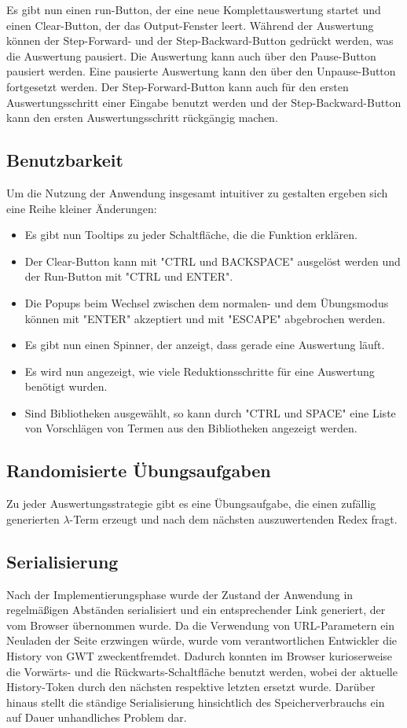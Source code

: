 \documentclass[parskip=full,11pt,openany]{scrreprt}
\begin{document}
Es gibt nun einen run-Button, der eine neue Komplettauswertung startet und einen Clear-Button, der das Output-Fenster leert.
Während der Auswertung können der Step-Forward- und der Step-Backward-Button gedrückt werden, was die Auswertung pausiert. 
Die Auswertung kann auch über den Pause-Button pausiert werden.
Eine pausierte Auswertung kann den über den Unpause-Button fortgesetzt werden.
Der Step-Forward-Button kann auch für den ersten Auswertungsschritt einer Eingabe benutzt werden und der Step-Back\-ward-Button
kann den ersten Auswertungsschritt rückgängig machen.

\subsection{Benutzbarkeit}
Um die Nutzung der Anwendung insgesamt intuitiver zu gestalten ergeben sich eine Reihe kleiner Änderungen:

\begin{itemize}
\item Es gibt nun Tooltips zu jeder Schaltfläche, die die Funktion erklären.
\item Der Clear-Button kann mit "CTRL und BACKSPACE" ausgelöst werden und der Run-Button mit "CTRL und ENTER".
\item Die Popups beim Wechsel zwischen dem normalen- und dem Übungsmodus können mit "ENTER" akzeptiert und mit
"ESCAPE" abgebrochen werden.
\item Es gibt nun einen Spinner, der anzeigt, dass gerade eine Auswertung läuft.
\item Es wird nun angezeigt, wie viele Reduktionsschritte für eine Auswertung benötigt wurden.
\item Sind Bibliotheken ausgewählt, so kann durch "CTRL und SPACE" eine Liste von Vorschlägen von Termen aus den 
Bibliotheken angezeigt werden.
\end{itemize}

\subsection{Randomisierte Übungsaufgaben}
Zu jeder Auswertungsstrategie gibt es eine Übungsaufgabe, die einen zufällig generierten $\lambda$-Term erzeugt
und nach dem nächsten auszuwertenden Redex fragt.

\subsection{Serialisierung}
Nach der Implementierungsphase wurde der Zustand der Anwendung in regelmäßigen Abständen serialisiert und 
ein entsprechender Link generiert, der vom Browser übernommen wurde.
Da die Verwendung von URL-Parametern ein Neuladen der Seite erzwingen würde, wurde vom verantwortlichen 
Entwickler die History von GWT zweckentfremdet.
Dadurch konnten im Browser kurioserweise die Vorwärts- und die Rückwarts-Schaltfläche benutzt werden, wobei
der aktuelle History-Token durch den nächsten respektive letzten ersetzt wurde.
Darüber hinaus stellt die ständige Serialisierung hinsichtlich des Speicherverbrauchs ein auf Dauer unhandliches
Problem dar.
\end{document}
